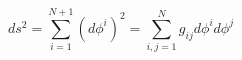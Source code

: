 \begin{equation}
ds^2=\sum_{i=1}^{N+1}(d\phi^i)^2=\sum_{i,j=1}^Ng_{ij}d\phi^id\phi^j
\label{lineelement}
\end{equation}

